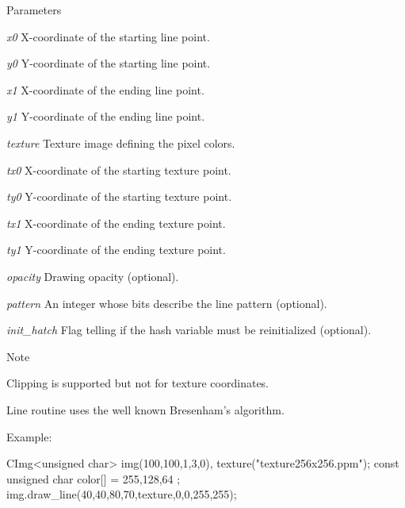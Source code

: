 \begin{DoxyParams}{Parameters}
\item[{\em x0}]X-\/coordinate of the starting line point. \item[{\em y0}]Y-\/coordinate of the starting line point. \item[{\em x1}]X-\/coordinate of the ending line point. \item[{\em y1}]Y-\/coordinate of the ending line point. \item[{\em texture}]Texture image defining the pixel colors. \item[{\em tx0}]X-\/coordinate of the starting texture point. \item[{\em ty0}]Y-\/coordinate of the starting texture point. \item[{\em tx1}]X-\/coordinate of the ending texture point. \item[{\em ty1}]Y-\/coordinate of the ending texture point. \item[{\em opacity}]Drawing opacity (optional). \item[{\em pattern}]An integer whose bits describe the line pattern (optional). \item[{\em init\_\-hatch}]Flag telling if the hash variable must be reinitialized (optional). \end{DoxyParams}
\begin{DoxyNote}{Note}

\begin{DoxyItemize}
\item Clipping is supported but not for texture coordinates.
\item Line routine uses the well known Bresenham's algorithm. 
\end{DoxyItemize}
\end{DoxyNote}
\begin{DoxyParagraph}{Example:}

\begin{DoxyCode}
       CImg<unsigned char> img(100,100,1,3,0), texture("texture256x256.ppm");
       const unsigned char color[] = { 255,128,64 };
       img.draw_line(40,40,80,70,texture,0,0,255,255);
\end{DoxyCode}
 
\end{DoxyParagraph}
